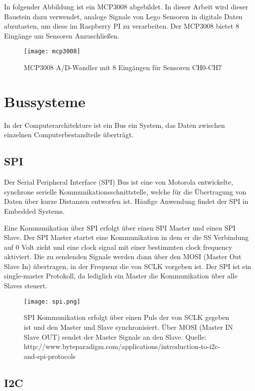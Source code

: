 In folgender Abbildung ist ein MCP3008 abgebildet. In dieser Arbeit wird dieser Baustein dazu verwendet, analoge Signale von Lego Sensoren in digitale Daten abzutasten, um diese im Raspberry PI zu verarbeiten. Der MCP3008 bietet 8 Eingänge um Sensoren Anzuschließen.

\begin{figure}[h]
  \centering
  \texttt{[image: mcp3008]}
  \caption{MCP3008 A/D-Wandler mit 8 Eingängen für Sensoren CH0-CH7}
  \label{Kap1:NXT}
\end{figure}


\section{Bussysteme}
In der Computerarchitekture ist ein Bus ein System, das Daten zwischen einzelnen Computerbestandteile überträgt.

\subsection{SPI}

Der Serial Peripheral Interface (SPI) Bus ist eine von Motorola entwickelte,  synchrone serielle Kommunikationsschnittstelle, welche für die Übertragung von Daten über kurze Distanzen entworfen ist.  Häufige Anwendung findet der SPI in Embedded Systems. 

Eine Kommunikation über SPI erfolgt über einen SPI Master und einen SPI Slave. Der SPI Master startet eine Kommunikation in dem er die SS Verbindung auf 0 Volt zieht und eine clock signal mit einer bestimmten clock frequency aktiviert. Die zu sendenden Signale werden dann über den MOSI (Master Out Slave In) übertragen, in der Frequenz die von SCLK vorgeben ist. Der SPI ist ein single-master Protokoll, da lediglich ein Master die Kommunikation über alle Slaves steuert.

\begin{figure}[h]
  \centering
  \texttt{[image: spi.png]}
  \caption{SPI Kommunikation erfolgt über einen Puls der von SCLK gegeben ist und den Master und Slave synchronisiert. Über MOSI (Master IN Slave OUT) sendet der Master Signale an den Slave. Quelle: http://www.byteparadigm.com/applications/introduction-to-i2c-and-spi-protocols}
  \label{Kap1:SPI}
\end{figure}


\subsection{I2C}

